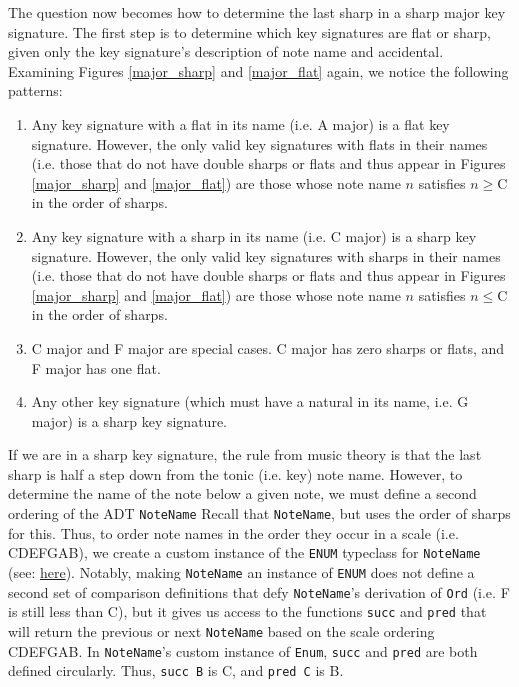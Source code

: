 \documentclass{report}
\begin{document}
The question now becomes how to determine the last sharp in a sharp major key signature. The first step is to determine which key signatures are flat or sharp, given only the key signature's description of note name and accidental. Examining Figures \ref{major_sharp} and \ref{major_flat} again, we notice the following patterns:
\begin{enumerate}
\item  Any key  signature with a flat in its name (i.e. A\musFlat \; major) is a flat key signature. However, the only valid key signatures with flats in their names (i.e. those that do not have double sharps or flats and thus appear in Figures \ref{major_sharp} and \ref{major_flat}) are those whose note name $n$ satisfies $n \geq $\;C in the order of sharps.
\item  Any key  signature with a sharp in its name (i.e. C\musSharp \; major) is a sharp key signature. However, the only valid key signatures with sharps in their names (i.e. those that do not have double sharps or flats and thus appear in Figures \ref{major_sharp} and \ref{major_flat}) are those whose note name $n$ satisfies $n \leq $\;C in the order of sharps.
\item  C major and F major are special cases. C major has zero sharps or flats, and F  major has one flat.
\item  Any other key signature (which must have a natural in its name, i.e. G major) is a sharp key signature.
\end{enumerate}

If we are in a sharp key signature, the rule from music theory is that the last sharp is half a step down from the tonic (i.e. key) note name. However, to determine the name of the note below a given note, we must define a second ordering of the ADT \verb.NoteName. Recall that \verb.NoteName., but uses the order of sharps for this. Thus, to order note names in the order they occur in a scale (i.e. CDEFGAB), we create a custom instance of the \verb.ENUM. typeclass for \verb.NoteName. (see: \href{https://github.com/ilanashapiro/MusAssist/blob/main/app/MusAssistAST.hs#L21}{here}). Notably, making \verb.NoteName. an instance of \verb.ENUM. does not define a second set of comparison definitions that defy \verb.NoteName.'s derivation of \verb.Ord. (i.e. F is still less than C), but it gives us access to the functions \verb.succ. and \verb.pred. that will return the previous or next \verb.NoteName. based on the scale ordering CDEFGAB. In \verb.NoteName.'s custom instance of \verb.Enum., \verb.succ. and \verb.pred. are both defined circularly. Thus, \verb.succ B. is C, and \verb.pred C. is B.
\end{document}
